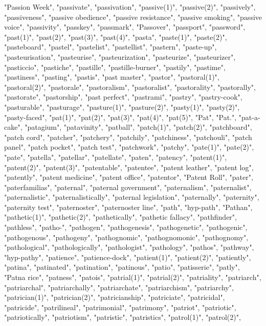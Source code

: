 "Passion Week",
"passivate",
"passivation",
"passive(1)",
"passive(2)",
"passively",
"passiveness",
"passive obedience",
"passive resistance",
"passive smoking",
"passive voice",
"passivity",
"passkey",
"passmark",
"Passover",
"passport",
"password",
"past(1)",
"past(2)",
"past(3)",
"past(4)",
"pasta",
"paste(1)",
"paste(2)",
"pasteboard",
"pastel",
"pastelist",
"pastellist",
"pastern",
"paste-up",
"pasteurisation",
"pasteurise",
"pasteurization",
"pasteurize",
"pasteurizer",
"pasticcio",
"pastiche",
"pastille",
"pastille-burner",
"pastily",
"pastime",
"pastiness",
"pasting",
"pastis",
"past master",
"pastor",
"pastoral(1)",
"pastoral(2)",
"pastorale",
"pastoralism",
"pastoralist",
"pastorality",
"pastorally",
"pastorate",
"pastorship",
"past perfect",
"pastrami",
"pastry",
"pastry-cook",
"pasturable",
"pasturage",
"pasture(1)",
"pasture(2)",
"pasty(1)",
"pasty(2)",
"pasty-faced",
"pat(1)",
"pat(2)",
"pat(3)",
"pat(4)",
"pat(5)",
"Pat",
"Pat.",
"pat-a-cake",
"patagium",
"patavinity",
"patball",
"patch(1)",
"patch(2)",
"patchboard",
"patch cord",
"patcher",
"patchery",
"patchily",
"patchiness",
"patchouli",
"patch panel",
"patch pocket",
"patch test",
"patchwork",
"patchy",
"pate(1)",
"pate(2)",
"pate",
"patella",
"patellar",
"patellate",
"paten",
"patency",
"patent(1)",
"patent(2)",
"patent(3)",
"patentable",
"patentee",
"patent leather",
"patent log",
"patently",
"patent medicine",
"patent office",
"patentor",
"Patent Roll",
"pater",
"paterfamilias",
"paternal",
"paternal government",
"paternalism",
"paternalist",
"paternalistic",
"paternalistically",
"paternal legislation",
"paternally",
"paternity",
"paternity test",
"paternoster",
"paternoster line",
"path",
"hyp-path",
"Pathan",
"pathetic(1)",
"pathetic(2)",
"pathetically",
"pathetic fallacy",
"pathfinder",
"pathless",
"patho-",
"pathogen",
"pathogenesis",
"pathogenetic",
"pathogenic",
"pathogenous",
"pathogeny",
"pathognomic",
"pathognomonic",
"pathognomy",
"pathological",
"pathologically",
"pathologist",
"pathology",
"pathos",
"pathway",
"hyp-pathy",
"patience",
"patience-dock",
"patient(1)",
"patient(2)",
"patiently",
"patina",
"patinated",
"patination",
"patinous",
"patio",
"patisserie",
"patly",
"Patna rice",
"patness",
"patois",
"patrial(1)",
"patrial(2)",
"patriality",
"patriarch",
"patriarchal",
"patriarchally",
"patriarchate",
"patriarchism",
"patriarchy",
"patrician(1)",
"patrician(2)",
"patricianship",
"patriciate",
"patricidal",
"patricide",
"patrilineal",
"patrimonial",
"patrimony",
"patriot",
"patriotic",
"patriotically",
"patriotism",
"patristic",
"patristics",
"patrol(1)",
"patrol(2)",
